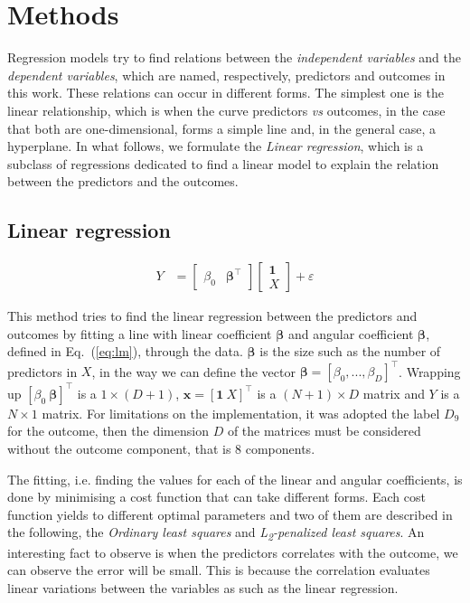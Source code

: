 \documentclass[conference]{IEEEtran}
\begin{document}
\section{Methods}\label{methods}

Regression models try to find relations between the \emph{independent variables} and the \emph{dependent variables}, which are named, respectively, predictors and outcomes in this work. These relations can occur in different forms. The simplest one is the linear relationship, which is when the curve predictors \textit{vs} outcomes, in the case that both are one-dimensional, forms a simple line and, in the general case, a hyperplane. In what follows, we formulate the \emph{Linear regression}, which is a subclass of regressions dedicated to find a linear model to explain the relation between the predictors and the outcomes. 


\subsection{Linear regression}

\begin{align} \label{eq:lm}   
  Y &= \begin{bmatrix} 
        \beta_0 & \boldsymbol{\beta}^\top 
       \end{bmatrix} 
       \begin{bmatrix} 
        \mathbf{1} \\ X 
      \end{bmatrix} + \varepsilon
\end{align} 

This method tries to find the linear regression between the predictors and outcomes by fitting a line with linear coefficient $\boldsymbol{\beta}$ and angular coefficient $\boldsymbol{\beta}$, defined in Eq.~(\ref{eq:lm}), through the data. $\boldsymbol{\beta}$ is the size such as the number of predictors in $X$, in the way we can define the vector $\boldsymbol{\beta} = [\beta_0, ..., \beta_D]^\top$. Wrapping up $[\beta_0 \ \boldsymbol{\beta}]^\top$ is a $1\times (D+1)$, $\mathbf{x} = [\mathbf{1} \ X]^\top$ is a $(N+1)\times D$ matrix and $Y$ is a $N\times 1$ matrix. For limitations on the implementation, it was adopted the label $D_9$ for the outcome, then the dimension $D$ of the matrices must be considered without the outcome component, that is 8 components.

The fitting, i.e. finding the values for each of the linear and angular coefficients, is done by minimising a cost function that can take different forms. Each cost function yields to different optimal parameters and two of them are described in the following, the \emph{Ordinary least squares} and \emph{L\textsubscript{2}-penalized least squares}. An interesting fact to observe is when the predictors correlates with the outcome, we can observe the error will be small. This is because the correlation evaluates linear variations between the variables as such as the linear regression.
\end{document}
